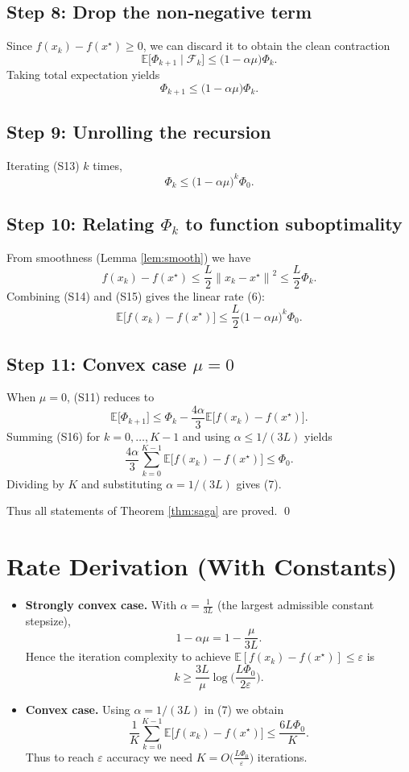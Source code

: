 \documentclass{article}
\newcommand{\E}{\mathbb{E}}
\newcommand{\norm}[1]{\left\|#1\right\|}
\begin{document}
\subsection*{Step 8: Drop the non‑negative term}
Since $f(x_k)-f(x^\star)\ge0$, we can discard it to obtain the clean contraction
\[
\E\!\big[\Phi_{k+1}\mid\mathcal{F}_k\big]\le\big(1-\alpha\mu\big)\Phi_k .
\tag{S12}
\]
Taking total expectation yields
\[
\Phi_{k+1}\le\big(1-\alpha\mu\big)\Phi_k .
\tag{S13}
\]

\subsection*{Step 9: Unrolling the recursion}
Iterating (S13) $k$ times,
\[
\Phi_k\le\big(1-\alpha\mu\big)^k\Phi_0 .
\tag{S14}
\]

\subsection*{Step 10: Relating $\Phi_k$ to function suboptimality}
From smoothness (Lemma \ref{lem:smooth}) we have
\[
f(x_k)-f(x^\star)\le\frac{L}{2}\norm{x_k-x^\star}^2\le\frac{L}{2}\Phi_k .
\tag{S15}
\]
Combining (S14) and (S15) gives the linear rate (6):
\[
\E\!\big[f(x_k)-f(x^\star)\big]\le\frac{L}{2}\big(1-\alpha\mu\big)^k\Phi_0 .
\]

\subsection*{Step 11: Convex case $\mu=0$}
When $\mu=0$, (S11) reduces to
\[
\E\!\big[\Phi_{k+1}\big]\le \Phi_k-\frac{4\alpha}{3}\E\!\big[f(x_k)-f(x^\star)\big].
\tag{S16}
\]
Summing (S16) for $k=0,\dots,K-1$ and using $\alpha\le1/(3L)$ yields
\[
\frac{4\alpha}{3}\sum_{k=0}^{K-1}\E\!\big[f(x_k)-f(x^\star)\big]\le\Phi_0 .
\]
Dividing by $K$ and substituting $\alpha=1/(3L)$ gives (7).

Thus all statements of Theorem \ref{thm:saga} are proved. \qed

\section*{Rate Derivation (With Constants)}
\begin{itemize}
\item \textbf{Strongly convex case.} With $\alpha=\frac{1}{3L}$ (the largest admissible constant stepsize),
\[
1-\alpha\mu = 1-\frac{\mu}{3L}.
\]
Hence the iteration complexity to achieve $\E[f(x_k)-f(x^\star)]\le\varepsilon$ is
\[
k\ge \frac{3L}{\mu}\log\!\Big(\frac{L\Phi_0}{2\varepsilon}\Big).
\]
\item \textbf{Convex case.} Using $\alpha=1/(3L)$ in (7) we obtain
\[
\frac1K\sum_{k=0}^{K-1}\E\!\big[f(x_k)-f(x^\star)\big]\le\frac{6L\Phi_0}{K}.
\]
Thus to reach $\varepsilon$ accuracy we need $K=O\!\big(\tfrac{L\Phi_0}{\varepsilon}\big)$ iterations.
\end{itemize}
\end{document}
